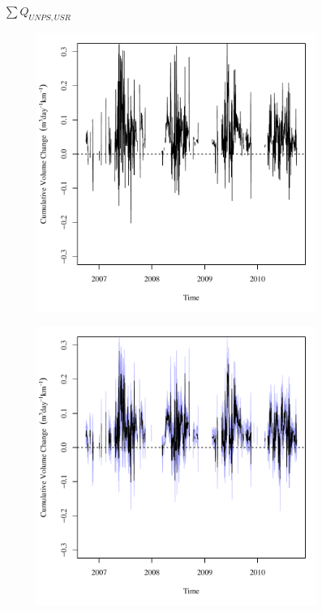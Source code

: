 \subfiguretop
\begin{landscape}
	\begin{figure}
		\centering
		$ \displaystyle \sum Q_{UNPS, USR} $
		\begin{subfigure}{0.7\textwidth}
			\centering
			\includegraphics[width=\tableCustomSize]{"Figures/Results_USR/Deterministic/Balance Water"}
		\end{subfigure}%
		\begin{subfigure}{0.7\textwidth}
			\centering
			\includegraphics[width=\tableCustomSize]{"Figures/Results_USR/Stochastic/Balance Water"}

\end{subfigure}
\end{figure}
\end{landscape}
